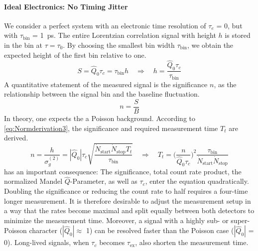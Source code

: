 \paragraph{Ideal Electronics: No Timing Jitter}\label{sec:Nojitter}
We consider a perfect system with an electronic time resolution of $\tau_e$ = \num{0}, but with $\tau_\mathrm{bin}$ = \SI{1}{\ps}. The entire Lorentzian correlation signal with height $h$ is stored in the bin at $\tau=\tau_0$. By choosing the smallest bin width $\tau_\mathrm{bin}$, we obtain the expected height of the first bin relative to one.
\begin{equation}\label{eq:Sheight}
	S=\hat{Q}_0\tau_c=\tau_\mathrm{bin}h\quad\Rightarrow\quad h=\dfrac{\hat{Q}_0\tau_c}{\tau_\mathrm{bin}}
\end{equation}
A quantitative statement of the measured signal is the significance $n$, as the relationship between the signal bin and the baseline fluctuation.
\begin{equation}\label{eq:StoB1}
	n=\dfrac{S}{B}
\end{equation}
In theory, one expects the a Poisson background. According to \cref{eq:Normderivation3}, the significance and required measurement time $T_t$ are derived.
\begin{equation}\label{eq:StoB2}
	n=\dfrac{h}{\sigma_g^{(2)}}=|\hat{Q}_0|\tau_c\sqrt{\dfrac{\dot{N}_\mathrm{start}\dot{N}_\mathrm{stop}T_t}{\tau_\mathrm{bin}}}\quad\Rightarrow\quad T_t=\Bigg(\dfrac{n}{\hat{Q}_0\tau_c}\Bigg)^2\dfrac{\tau_\mathrm{bin}}{\dot{N}_\mathrm{start}\dot{N}_\mathrm{stop}}
\end{equation}
 has an important consequence: The significance, total count rate product, the normalized Mandel $\hat{Q}$-Parameter, as well as $\tau_c$, enter the equation quadratically. Doubling the significance or reducing the count rate to half requires a four-time longer measurement. It is therefore desirable to adjust the measurement setup in a way that the rates become maximal and split equally between both detectors to minimize the measurement time. Moreover, a signal with a highly sub- or super-Poisson character ($|\hat{Q}_0|\approx$ \num{1}) can be resolved faster than the Poisson case ($|\hat{Q}_0|$ = \num{0}). Long-lived signals, when $\tau_c$ becomes $\tau_\mathrm{ex}$, also shorten the measurement time.

